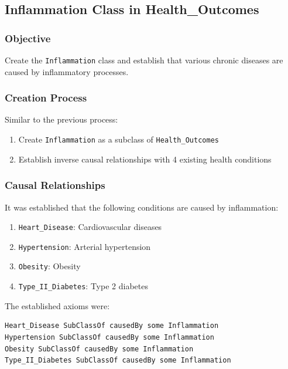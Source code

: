 \documentclass[12pt,a4paper]{article}
\begin{document}
\subsection{Inflammation Class in Health\_Outcomes}

\subsubsection{Objective}

Create the \texttt{Inflammation} class and establish that various chronic diseases are caused by inflammatory processes.

\subsubsection{Creation Process}

Similar to the previous process:
\begin{enumerate}
    \item Create \texttt{Inflammation} as a subclass of \texttt{Health\_Outcomes}
    \item Establish inverse causal relationships with 4 existing health conditions
\end{enumerate}

\subsubsection{Causal Relationships}

It was established that the following conditions are caused by inflammation:

\begin{enumerate}
    \item \texttt{Heart\_Disease}: Cardiovascular diseases
    \item \texttt{Hypertension}: Arterial hypertension
    \item \texttt{Obesity}: Obesity
    \item \texttt{Type\_II\_Diabetes}: Type 2 diabetes
\end{enumerate}

The established axioms were:

\begin{verbatim}
Heart_Disease SubClassOf causedBy some Inflammation
Hypertension SubClassOf causedBy some Inflammation
Obesity SubClassOf causedBy some Inflammation
Type_II_Diabetes SubClassOf causedBy some Inflammation
\end{verbatim}
\end{document}
